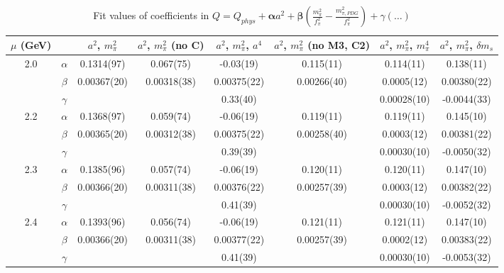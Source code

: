 \documentclass[12pt]{extarticle}
\begin{document}
\begin{table}[h!]
\begin{center}
\begin{tabular}{|c c|c|c|c|c|c|c|}
\hline
$\mu$ (GeV) &  & $a^2$, $m_\pi^2$& $a^2$, $m_\pi^2$ (no C)& $a^2$, $m_\pi^2$, $a^4$& $a^2$, $m_\pi^2$ (no M3, C2)& $a^2$, $m_\pi^2$, $m_\pi^4$& $a^2$, $m_\pi^2$, $\delta m_s$\\
\hline
\multirow{3}{0.5in}{2.0} & $\alpha$ & 0.1314(97)& 0.067(75)& -0.03(19)& 0.115(11)& 0.114(11)& 0.138(11)\\
 & $\beta$ & 0.00367(20)& 0.00318(38)& 0.00375(22)& 0.00266(40)& 0.0005(12)& 0.00380(22)\\
 & $\gamma$ &  &  & 0.33(40)&  & 0.00028(10)& -0.0044(33)\\
\hline
\multirow{3}{0.5in}{2.2} & $\alpha$ & 0.1368(97)& 0.059(74)& -0.06(19)& 0.119(11)& 0.119(11)& 0.145(10)\\
 & $\beta$ & 0.00365(20)& 0.00312(38)& 0.00375(22)& 0.00258(40)& 0.0003(12)& 0.00381(22)\\
 & $\gamma$ &  &  & 0.39(39)&  & 0.00030(10)& -0.0050(32)\\
\hline
\multirow{3}{0.5in}{2.3} & $\alpha$ & 0.1385(96)& 0.057(74)& -0.06(19)& 0.120(11)& 0.120(11)& 0.147(10)\\
 & $\beta$ & 0.00366(20)& 0.00311(38)& 0.00376(22)& 0.00257(39)& 0.0003(12)& 0.00382(22)\\
 & $\gamma$ &  &  & 0.41(39)&  & 0.00030(10)& -0.0052(32)\\
\hline
\multirow{3}{0.5in}{2.4} & $\alpha$ & 0.1393(96)& 0.056(74)& -0.06(19)& 0.121(11)& 0.121(11)& 0.147(10)\\
 & $\beta$ & 0.00366(20)& 0.00311(38)& 0.00377(22)& 0.00257(39)& 0.0002(12)& 0.00383(22)\\
 & $\gamma$ &  &  & 0.41(39)&  & 0.00030(10)& -0.0053(32)\\
\hline
\end{tabular}
\caption{Fit values of coefficients in $Q = Q_{phys} + \mathbf{\alpha} a^2 + \mathbf{\beta}\left(\frac{m_\pi^2}{f_\pi^2}-\frac{m_{\pi,PDG}^2}{f_\pi^2}\right) + \gamma(\ldots)$}
\end{center}
\end{table}






\end{document}

